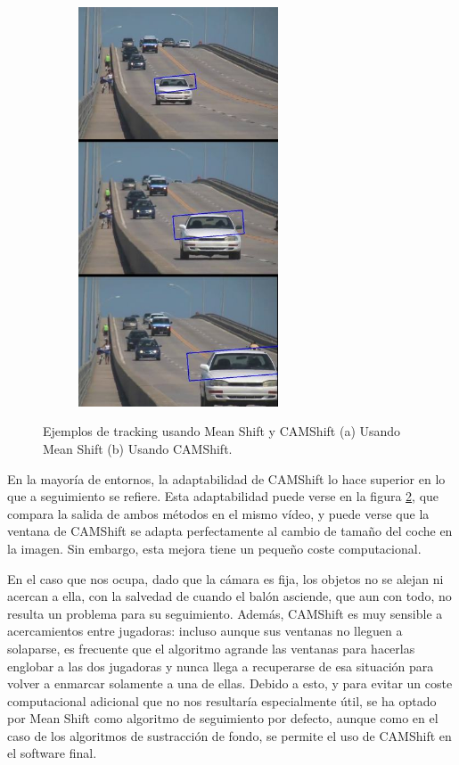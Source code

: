 \begin{figure}
\begin{subfigure}{.4\textwidth}
    \includegraphics[width=0.65\textwidth]{images/cochecamshift}
    \caption{ }
    \label{fig:ejemplos1b}
  \end{subfigure}
  \caption{Ejemplos de tracking usando Mean Shift y CAMShift (a) Usando Mean Shift (b) Usando CAMShift.}
  \label{fig:ejemplos}
\end{figure}

En la mayoría de entornos, la adaptabilidad de CAMShift lo hace superior en lo que a seguimiento se refiere. Esta adaptabilidad puede verse en la figura \ref{fig:ejemplos}, que compara la salida de ambos métodos en el mismo vídeo, y puede verse que la ventana de CAMShift se adapta perfectamente al cambio de tamaño del coche en la imagen. Sin embargo, esta mejora tiene un pequeño coste computacional. 

En el caso que nos ocupa, dado que la cámara es fija, los objetos no se alejan ni acercan a ella, con la salvedad de cuando el balón asciende, que aun con todo, no resulta un problema para su seguimiento. Además, CAMShift es muy sensible a acercamientos entre jugadoras: incluso aunque sus ventanas no lleguen a solaparse, es frecuente que el algoritmo agrande las ventanas para hacerlas englobar a las dos jugadoras y nunca llega a recuperarse de esa situación para volver a enmarcar solamente a una de ellas. Debido a esto, y para evitar un coste computacional adicional que no nos resultaría especialmente útil, se ha optado por Mean Shift como algoritmo de seguimiento por defecto, aunque como en el caso de los algoritmos de sustracción de fondo, se permite el uso de CAMShift en el software final.

